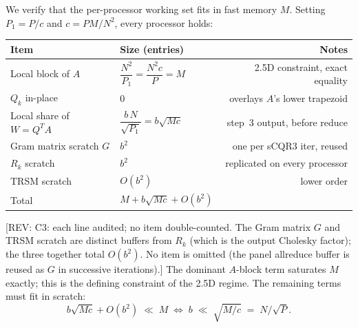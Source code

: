 \documentclass[11pt]{article}
\newcommand{\REV}[1]{\textcolor{blue!60!black}{\small\textsf{[REV: #1]}}}
\begin{document}
We verify that the per-processor working set fits in fast memory $M$.
Setting $P_1 = P/c$ and $c = PM/N^2$, every processor holds:
\begin{center}
\begin{tabular}{@{}llr@{}}
\toprule
Item & Size (entries) & Notes \\
\midrule
Local block of $A$               & $\dfrac{N^2}{P_1} = \dfrac{N^2 c}{P} = M$       & 2.5D constraint, exact equality \\[6pt]
$Q_k$ in-place                    & $0$                                              & overlays $A$'s lower trapezoid \\
Local share of $W = Q^T A$        & $\dfrac{b\,N}{\sqrt{P_1}} = b\sqrt{Mc}$         & step~3 output, before reduce \\[6pt]
Gram matrix scratch $G$           & $b^2$                                            & one per sCQR3 iter, reused \\
$R_k$ scratch                     & $b^2$                                            & replicated on every processor \\
TRSM scratch                      & $O(b^2)$                                         & lower order \\
\midrule
Total                             & $M + b\sqrt{Mc} + O(b^2)$                       & \\
\bottomrule
\end{tabular}
\end{center}

\REV{C3: each line audited; no item double-counted. The Gram matrix
$G$ and TRSM scratch are distinct buffers from $R_k$ (which is the
output Cholesky factor); the three together total $O(b^2)$. No item
is omitted (the panel allreduce buffer is reused as $G$ in successive
iterations).} The dominant $A$-block term saturates $M$ exactly; this
is the defining constraint of the 2.5D regime. The remaining terms
must fit in scratch:
\[
  b \sqrt{Mc} + O(b^2) \;\ll\; M
  \;\Longleftrightarrow\;
  b \;\ll\; \sqrt{M/c} \;=\; N/\sqrt{P}.
\]
\end{document}
